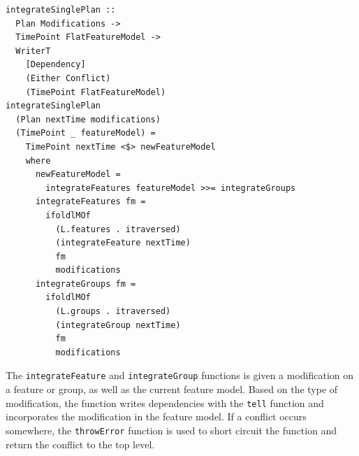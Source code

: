 \documentclass[a4paper,english]{ifimaster}
\begin{document}
\begin{verbatim}
integrateSinglePlan ::
  Plan Modifications ->
  TimePoint FlatFeatureModel ->
  WriterT
    [Dependency]
    (Either Conflict)
    (TimePoint FlatFeatureModel)
integrateSinglePlan
  (Plan nextTime modifications)
  (TimePoint _ featureModel) =
    TimePoint nextTime <$> newFeatureModel
    where
      newFeatureModel =
        integrateFeatures featureModel >>= integrateGroups
      integrateFeatures fm =
        ifoldlMOf
          (L.features . itraversed)
          (integrateFeature nextTime)
          fm
          modifications
      integrateGroups fm =
        ifoldlMOf
          (L.groups . itraversed)
          (integrateGroup nextTime)
          fm
          modifications
\end{verbatim}

The \texttt{integrateFeature} and \texttt{integrateGroup} functions is given a modification on a feature or group, as well as the current feature model. Based on the type of modification, the function writes dependencies with the \texttt{tell} function and incorporates the modification in the feature model. If a conflict occurs somewhere, the \texttt{throwError} function is used to short circuit the function and return the conflict to the top level.
\end{document}
